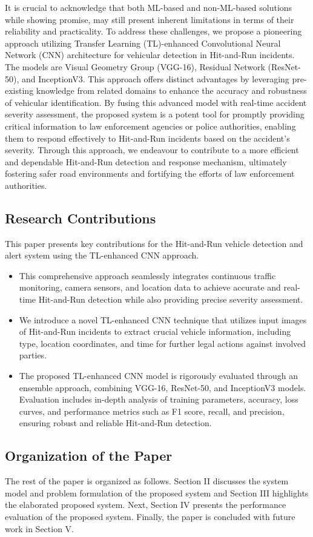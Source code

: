 \documentclass[10pt, conference, a4paper, compsocconf]{IEEEtran}
\begin{document}
\indent It is crucial to acknowledge that both ML-based and non-ML-based solutions while showing promise, may still present inherent limitations in terms of their reliability and practicality. To address these challenges, we propose a pioneering approach utilizing Transfer Learning (TL)-enhanced Convolutional Neural Network (CNN) architecture for vehicular detection in Hit-and-Run incidents. The models are Visual Geometry Group (VGG-16), Residual Network (ResNet-50), and InceptionV3. This approach offers distinct advantages by leveraging pre-existing knowledge from related domains to enhance the accuracy and robustness of vehicular identification. By fusing this advanced model with real-time accident severity assessment, the proposed system is a potent tool for promptly providing critical information to law enforcement agencies or police authorities, enabling them to respond effectively to Hit-and-Run incidents based on the accident's severity. Through this approach, we endeavour to contribute to a more efficient and dependable Hit-and-Run detection and response mechanism, ultimately fostering safer road environments and fortifying the efforts of law enforcement authorities.
\subsection{Research Contributions}
This paper presents key contributions for the Hit-and-Run vehicle detection and alert system using the TL-enhanced CNN approach.
\begin{itemize}
    \item This comprehensive approach seamlessly integrates continuous traffic monitoring, camera sensors, and location data to achieve accurate and real-time Hit-and-Run detection while also providing precise severity assessment.
    \item We introduce a novel TL-enhanced CNN technique that utilizes input images of Hit-and-Run incidents to extract crucial vehicle information, including type, location coordinates, and time for further legal actions against involved parties. 
    \item The proposed TL-enhanced CNN model is rigorously evaluated through an ensemble approach, combining VGG-16, ResNet-50, and InceptionV3 models. Evaluation includes in-depth analysis of training parameters, accuracy, loss curves, and performance metrics such as F1 score, recall, and precision, ensuring robust and reliable Hit-and-Run detection.
\end{itemize}
\subsection{Organization of the Paper}
The rest of the paper is organized as follows. Section II discusses the system model and problem formulation of the proposed system and Section III highlights the elaborated proposed system. Next, Section IV presents the performance evaluation of the proposed system. Finally, the paper is concluded with future work in Section V.
\end{document}
